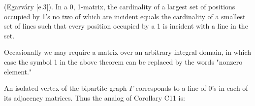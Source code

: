 (Egarváry [e.3]). In a {0, 1}-matrix, the cardinality of a largest set of positions occupied by 1's no two of which are incident equals the cardinality of a smallest set of lines such that every position occupied by a 1 is incident with a line in the set.

Occasionally we may require a matrix over an arbitrary integral domain, in which case the symbol 1 in the above theorem can be replaced by the words "nonzero element."

An isolated vertex of the bipartite graph $\Gamma$ corresponds to a line of 0's in each of its adjacency matrices. Thus the analog of Corollary C11 is:
